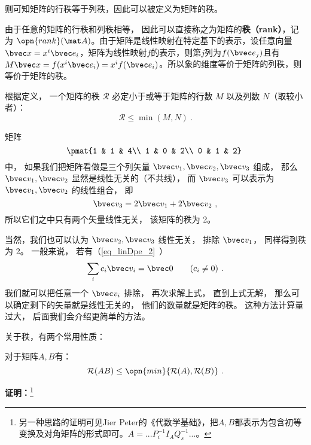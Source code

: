 则可知矩阵的行秩等于列秩，因此可以被定义为矩阵的秩。

\begin{definition}{}
由于任意的矩阵的行秩和列秩相等， 因此可以直接称之为矩阵的\textbf{秩（rank）}，记为 $\opn{rank}(\mat A)$。由于矩阵是线性映射在特定基下的表示，设任意向量$\bvec x=x^i\bvec e_i$，矩阵为线性映射$f$的表示，则第$j$列为$f(\bvec e_j)$且有$M\bvec x=f(x^i\bvec  e_i)=x^if(\bvec e_i)$。所以象的维度等价于矩阵的列秩，则等价于矩阵的秩。
\end{definition}




\begin{theorem}{}
根据定义， 一个矩阵的秩 $\mathcal R$ 必定小于或等于矩阵的行数 $M$ 以及列数 $N$（取较小者）：
\begin{equation}
\mathcal R\leq \min (M, N)~.
\end{equation}
\end{theorem}

\begin{example}{}
矩阵
\begin{equation}\label{eq_MatRnk_1}
\pmat{1 & 1 & 4\\ 1 & 0 & 2\\ 0 & 1 & 2}~
\end{equation}
中， 如果我们把矩阵看做是三个列矢量 $\bvec v_1, \bvec v_2, \bvec v_3$ 组成， 那么 $\bvec v_1, \bvec v_2$ 显然是线性无关的（不共线）， 而 $\bvec v_3$ 可以表示为 $\bvec v_1, \bvec v_2$ 的线性组合， 即
\begin{equation}
\bvec v_3 = 2\bvec v_1 + 2\bvec v_2~,
\end{equation}
所以它们之中只有两个矢量线性无关， 该矩阵的秩为 2。

当然，我们也可以认为 $\bvec v_2, \bvec v_3$ 线性无关， 排除 $\bvec v_1$， 同样得到秩为 2。 一般来说， 若有（\autoref{eq_linDpe_2}~）
\begin{equation}
\sum_i c_i \bvec v_i = \bvec 0 \qquad (c_i \ne 0)~.
\end{equation}
我们就可以把任意一个 $\bvec v_i$ 排除， 再次求解上式， 直到上式无解， 那么可以确定剩下的矢量就是线性无关的， 他们的数量就是矩阵的秩。 这种方法计算量过大， 后面我们会介绍更简单的方法。
\end{example}
关于秩，有两个常用性质：
\begin{theorem}{}
对于矩阵$A,B$有：
\begin{equation}
\mathcal R(AB)\le\opn{min}\{\mathcal R(A),\mathcal R(B)\}~.
\end{equation}
\end{theorem}
\textbf{证明：}\footnote{另一种思路的证明可见Jier Peter的《代数学基础》，把$A,B$都表示为包含初等变换及对角矩阵的形式即可。$A=...P^{-1}_iI_AQ^{-1}_s...$。}


